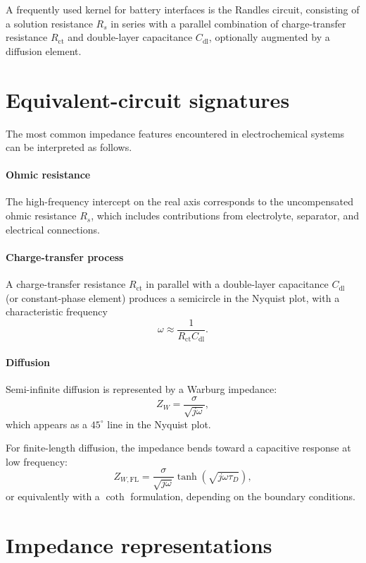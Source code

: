 A frequently used kernel for battery interfaces is the Randles circuit, consisting of a solution resistance $R_s$ in series with a parallel combination of charge-transfer resistance $R_{\mathrm{ct}}$ and double-layer capacitance $C_{\mathrm{dl}}$, optionally augmented by a diffusion element.

\section{Equivalent-circuit signatures}

The most common impedance features encountered in electrochemical systems can be interpreted as follows.

\paragraph{Ohmic resistance}
The high-frequency intercept on the real axis corresponds to the uncompensated ohmic resistance $R_s$, which includes contributions from electrolyte, separator, and electrical connections.

\paragraph{Charge-transfer process}
A charge-transfer resistance $R_{\mathrm{ct}}$ in parallel with a double-layer capacitance $C_{\mathrm{dl}}$ (or constant-phase element) produces a semicircle in the Nyquist plot, with a characteristic frequency
\[
\omega \approx \frac{1}{R_{\mathrm{ct}} C_{\mathrm{dl}}}.
\]

\paragraph{Diffusion}
Semi-infinite diffusion is represented by a Warburg impedance:
\begin{equation}
    Z_W = \frac{\sigma}{\sqrt{j\omega}},
\end{equation}
which appears as a $45^\circ$ line in the Nyquist plot.

For finite-length diffusion, the impedance bends toward a capacitive response at low frequency:
\begin{equation}
    Z_{W,\mathrm{FL}} = \frac{\sigma}{\sqrt{j\omega}} 
    \tanh\!\left(\sqrt{j\omega \tau_D}\right),
\end{equation}
or equivalently with a $\coth$ formulation, depending on the boundary conditions.

\section{Impedance representations}

